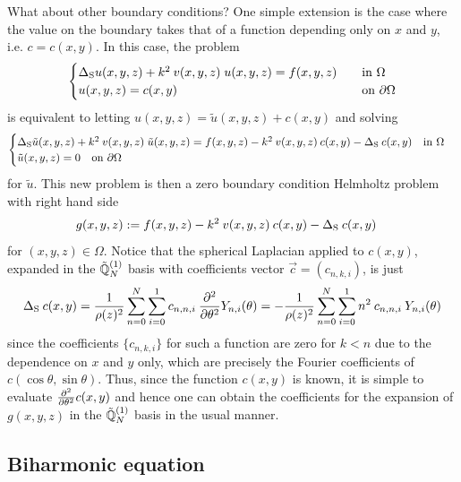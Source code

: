 \documentclass[11pt, oneside]{article}   	%
\begin{document}
What about other boundary conditions? One simple extension is the case where the value on the boundary takes that of a function depending only on $x$ and $y$, i.e. $c = c(x,y)$. In this case, the problem
\begin{align*}
	\begin{cases}
    		\Delta_{\rm S} u(x,y,z) + k^2 \: v(x,y,z) \; u(x,y,z) = f(x,y,z) &\quad \text{in } \Omega \\
		u(x,y,z) = c(x,y) &\quad \text{on } \partial \Omega
	\end{cases}
\end{align*}
is equivalent to letting $u(x,y,z) = \tilde{u}(x,y,z)+ c(x,y)$ and solving
\begin{align*}
	\begin{cases}
    		\Delta_{\rm S} \tilde{u}(x,y,z) + k^2 \: v(x,y,z) \; \tilde{u}(x,y,z) = f(x,y,z) - k^2 \: v(x,y,z) \: c(x,y) - \Delta_{\rm S} \: c(x,y)  \quad \text{in } \Omega \\
		\tilde{u}(x,y,z) = 0 \quad \text{on } \partial \Omega
	\end{cases}
\end{align*}
for $\tilde u$. This new problem is then a zero boundary condition Helmholtz problem with right hand side 
\begin{align*}
	g(x,y,z) &:= f(x,y,z) - k^2 \: v(x,y,z) \: c(x,y) - \Delta_{\rm S} \: c(x,y)
\end{align*}
for $(x,y,z) \in \Omega$. Notice that the spherical Laplacian applied to $c(x,y)$, expanded in the ${\mathbb{\tilde Q}}_{N}^{(1)}$ basis with coefficients vector $\vec c = (c_{n,k,i})$, is just
\begin{align*}
	\Delta_{\rm S} \: c(x,y) = {1 \over \rho(z)^2} \sum_{n=0}^N \sum_{i=0}^1 c_{n,n,i} \: {\partial^{2} \over \partial {\theta}^{2}} Y_{n,i}(\theta) = - {1 \over \rho(z)^2} \sum_{n=0}^N \sum_{i=0}^1 n^2 \: c_{n,n,i} \: Y_{n,i}(\theta)
\end{align*}
since the coefficients $\{c_{n,k,i}\}$ for such a function are zero for $k < n$ due to the dependence on $x$ and $y$ only, which are precisely the Fourier coefficients of $c(\cos \theta, \sin \theta)$. Thus, since the function $c(x,y)$ is known, it is simple to evaluate ${\partial^{2} \over \partial {\theta}^{2}} c(x,y)$ and hence one can obtain the coefficients for the expansion of $g(x,y,z)$ in the ${\mathbb{\tilde Q}}_{N}^{(1)}$ basis in the usual manner.


\subsection{Biharmonic equation}
\end{document}
